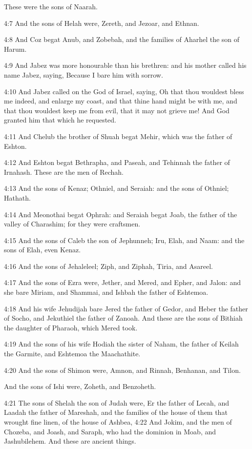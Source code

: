 These were the sons of Naarah.

4:7 And the sons of Helah were, Zereth, and Jezoar, and Ethnan.

4:8 And Coz begat Anub, and Zobebah, and the families of Aharhel the
son of Harum.

4:9 And Jabez was more honourable than his brethren: and his mother
called his name Jabez, saying, Because I bare him with sorrow.

4:10 And Jabez called on the God of Israel, saying, Oh that thou
wouldest bless me indeed, and enlarge my coast, and that thine hand
might be with me, and that thou wouldest keep me from evil, that it
may not grieve me! And God granted him that which he requested.

4:11 And Chelub the brother of Shuah begat Mehir, which was the father
of Eshton.

4:12 And Eshton begat Bethrapha, and Paseah, and Tehinnah the father
of Irnahash. These are the men of Rechah.

4:13 And the sons of Kenaz; Othniel, and Seraiah: and the sons of
Othniel; Hathath.

4:14 And Meonothai begat Ophrah: and Seraiah begat Joab, the father of
the valley of Charashim; for they were craftsmen.

4:15 And the sons of Caleb the son of Jephunneh; Iru, Elah, and Naam:
and the sons of Elah, even Kenaz.

4:16 And the sons of Jehaleleel; Ziph, and Ziphah, Tiria, and Asareel.

4:17 And the sons of Ezra were, Jether, and Mered, and Epher, and
Jalon: and she bare Miriam, and Shammai, and Ishbah the father of
Eshtemoa.

4:18 And his wife Jehudijah bare Jered the father of Gedor, and Heber
the father of Socho, and Jekuthiel the father of Zanoah. And these are
the sons of Bithiah the daughter of Pharaoh, which Mered took.

4:19 And the sons of his wife Hodiah the sister of Naham, the father
of Keilah the Garmite, and Eshtemoa the Maachathite.

4:20 And the sons of Shimon were, Amnon, and Rinnah, Benhanan, and
Tilon.

And the sons of Ishi were, Zoheth, and Benzoheth.

4:21 The sons of Shelah the son of Judah were, Er the father of Lecah,
and Laadah the father of Mareshah, and the families of the house of
them that wrought fine linen, of the house of Ashbea, 4:22 And Jokim,
and the men of Chozeba, and Joash, and Saraph, who had the dominion in
Moab, and Jashubilehem. And these are ancient things.

